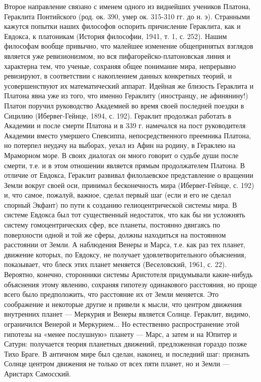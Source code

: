 Второе направление связано с именем одного из виднейших учеников
Платона, Гераклита Понтийского (род. ок. 390, умер ок. 315-310 гг. до
н. э). Странными кажутся попытки наших философов оспорить причисление
Гераклита, как и Евдокса, к платоникам (История философии, 1941, т. 1,
с. 252). Нашим философам вообще привычно, что малейшее изменение
общепринятых взглядов является уже ревизионизмом, но вся
пифагорейско-платоновская линия и характерна тем, что ученые, сохраняя
общее понимание мира, непрерывно ревизируют, в соответствии с
накоплением данных конкретных теорий, и усовершенствуют их
математический аппарат. Идейная же близость Гераклита и Платона явна
уже из того, что именно Гераклиту (иностранцу, не афинянину!) Платон
поручил руководство Академией во время своей последней поездки в
Сицилию (Ибервег-Гейнце, 1894, с. 192). Гераклит продолжал работать в
Академии и после смерти Платона и в 339 г. намечался на пост
руководителя Академии вместо умершего Спевсиппа, непосредственного
преемника Платона, но потерпел неудачу на выборах, уехал из Афин на
родину, в Гераклею на Мраморном море. В своих диалогах он много
говорит о судьбе души после смерти, т.е. и в этом отношении является
прямым продолжателем Платона. В отличие от Евдокса, Гераклит развивал
филолаевское представление о вращении Земли вокруг своей оси, принимал
бесконечность мира (Ибервег-Гейнце, с. 192) и, что самое, пожалуй,
важное, сделал первый шаг (если и его не сделал спорный Экфант) по
пути к созданию гелиоцентрической системы мира. В системе Евдокса был
тот существенный недостаток, что как бы ни усложнять систему
гомоцентрических сфер, все планеты, постоянно двигаясь по поверхности
одной и той же сферы, должны находиться на постоянном расстоянии от
Земли. А наблюдения Венеры и Марса, т.е. как раз тех планет, движение
которых, по Евдоксу, не получает удовлетворительного объяснения,
показывает, что блеск этих планет меняется (Веселовский, 1961, с. 22).
Вероятно, конечно, сторонники системы Аристотеля придумывали
какие-нибудь объяснения этому явлению, сохраняя гипотезу одинакового
расстояния, но проще всего было предположить, что расстояние их от
Земли меняется. Это соображение и некоторые другие и привели к мысли,
что центром движения внутренних планет --- Меркурия и Венеры является
Солнце. Гераклит, видимо, ограничился Венерой и Меркурием... Но
естественно распространение этой гипотезы на «менее послушную» планету
--- Марс, а затем и на Юпитер и Сатурн: получается теория планетных
движений, предложенная гораздо позже Тихо Браге. В античном мире был
сделан, наконец, и последний шаг: признать Солнце центром движения не
только от всех пяти планет, но и Земли --- Аристарх Самосский.

